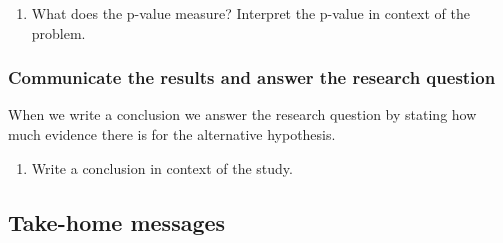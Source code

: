 \documentclass[
]{report}
\providecommand{\tightlist}{%
  \setlength{\itemsep}{0pt}\setlength{\parskip}{0pt}}
\begin{document}
\begin{enumerate}
\def\labelenumi{\arabic{enumi}.}
\setcounter{enumi}{24}
\tightlist
\item
  What does the p-value measure? Interpret the p-value in context of the problem.
\end{enumerate}

\vspace{1in}

\hypertarget{communicate-the-results-and-answer-the-research-question}{%
\subsubsection*{Communicate the results and answer the research question}\label{communicate-the-results-and-answer-the-research-question}}

When we write a conclusion we answer the research question by stating how much evidence there is for the alternative hypothesis.

\begin{enumerate}
\def\labelenumi{\arabic{enumi}.}
\setcounter{enumi}{25}
\tightlist
\item
  Write a conclusion in context of the study.
\end{enumerate}

\vspace{1in}

\hypertarget{take-home-messages-9}{%
\subsection{Take-home messages}\label{take-home-messages-9}}
\end{document}

